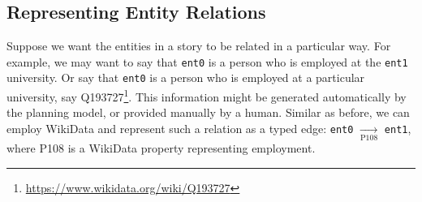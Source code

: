 \documentclass[11pt,a4paper]{article}
\begin{document}
\subsection{Representing Entity Relations}
Suppose we want the entities in a story to be related in a particular way. For example, we may want to say that \texttt{ent0} is a person who is employed at the \texttt{ent1} university. Or say that \texttt{ent0} is a person who is employed at a particular university, say Q193727\footnote{\url{https://www.wikidata.org/wiki/Q193727}}. This information might be generated automatically by the planning model, or provided manually by a human. Similar as before, we can employ WikiData and represent such a relation as a typed edge: \texttt{ent0} $\xrightarrow[\text{P108}]{}$ \texttt{ent1}, where P108 is a WikiData property representing employment.





\end{document}
